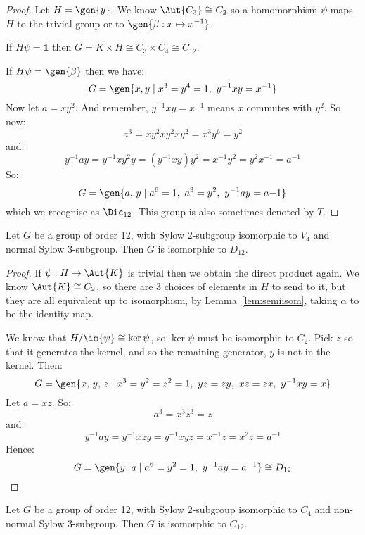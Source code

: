 \begin{proof}
    Let \(H = \gen{y}\).
    We know \(\Aut{C_3} \cong C_2\) so a homomorphism \(\psi\) maps \(H\) to the trivial group or to \(\gen{\beta:x
    \mapsto x^{-1}}\).

    If \(H\psi = \bm{1}\) then \(G = K \times H \cong C_3 \times C_4 \cong C_{12}\).

    If \(H\psi = \gen{\beta}\) then we have:
    \[G = \gen{x, y \mid x^3 = y^4 = 1,\ y^{-1}xy = x^{-1}}\]
    Now let \(a = xy^2\).
    And remember, \(y^{-1}xy = x^{-1}\) means \(x\) commutes with \(y^2\).
    So now:
    \[a^3 = xy^2xy^2xy^2 = x^3y^6 = y^2\]
    and:
    \[y^{-1}ay = y^{-1}xy^2y = (y^{-1}xy)y^2 = x^{-1}y^2 = y^2x^{-1} = a^{-1}\]
    So:
    \[G = \gen{a,\,y \mid a^6 = 1,\ a^3 = y^2,\ y^{-1}ay = a{-1}}\]
    which we recognise as \(\Dic_{12}\).
    This group is also sometimes denoted by \(T\).
\end{proof}

\begin{lemma}
    Let \(G\) be a group of order 12, with Sylow 2-subgroup isomorphic to \(V_4\) and normal Sylow 3-subgroup.
    Then \(G\) is isomorphic to \(D_{12}\).
\end{lemma}

\begin{proof}
    If \(\psi:H \to \Aut{K}\) is trivial then we obtain the direct product again.
    We know \(\Aut{K} \cong C_2\), so there are 3 choices of elements in \(H\) to send to it, but they are all
    equivalent up to isomorphism, by Lemma~\ref{lem:semiisom}, taking \(\alpha\) to be the identity map.

    We know that \(H / \im{\psi} \cong \ker{\psi}\), so \(\ker{\psi}\) must be isomorphic to \(C_2\).
    Pick \(z\) so that it generates the kernel, and so the remaining generator, \(y\) is not in the kernel.
    Then:
    \[G = \gen{x,\,y,\,z \mid x^3 = y^2 = z^2 = 1,\ yz = zy,\ xz = zx,\ y^{-1}xy = x}\]
    Let \(a = xz\).
    So:
    \[a^3 = x^3z^3 = z\]
    and:
    \[ y^{-1}ay = y^{-1}xzy = y^{-1}xyz = x^{-1}z = x^2z = a^{-1}\]
    Hence:
    \[G = \gen{y,\,a \mid a^6 = y^2 = 1,\ y^{-1}ay = a^{-1}} \cong D_{12}\]
\end{proof}

\begin{lemma}
    Let \(G\) be a group of order 12, with Sylow 2-subgroup isomorphic to \(C_4\) and non-normal Sylow 3-subgroup.
    Then \(G\) is isomorphic to \(C_{12}\).
\end{lemma}

